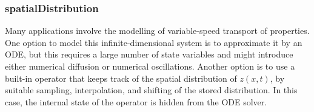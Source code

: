 \subsubsection{spatialDistribution}\label{spatialdistribution}

\begin{nonnormative}
Many applications involve the modelling of variable-speed transport of properties.
One option to model this infinite-dimensional system is to approximate it by an ODE, but this requires a large number of state variables and might introduce either numerical diffusion or numerical oscillations.
Another option is to use a built-in operator that keeps track of the spatial distribution of $z(x, t)$, by suitable sampling, interpolation, and shifting of the stored distribution.
In this case, the internal state of the operator is hidden from the ODE solver.
\end{nonnormative}

